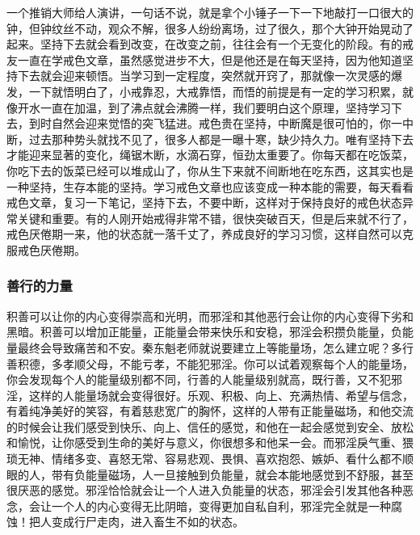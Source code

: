 一个推销大师给人演讲，一句话不说，就是拿个小锤子一下一下地敲打一口很大的钟，但钟纹丝不动，观众不解，很多人纷纷离场，过了很久，那个大钟开始晃动了起来。坚持下去就会看到改变，在改变之前，往往会有一个无变化的阶段。有的戒友一直在学戒色文章，虽然感觉进步不大，但是他还是在每天坚持，因为他知道坚持下去就会迎来顿悟。当学习到一定程度，突然就开窍了，那就像一次灵感的爆发，一下就悟明白了，小戒靠忍，大戒靠悟，而悟的前提是有一定的学习积累，就像开水一直在加温，到了沸点就会沸腾一样，我们要明白这个原理，坚持学习下去，到时自然会迎来觉悟的突飞猛进。戒色贵在坚持，中断魔是很可怕的，你一中断，过去那种势头就找不见了，很多人都是一曝十寒，缺少持久力。唯有坚持下去才能迎来显著的变化，绳锯木断，水滴石穿，恒劲太重要了。你每天都在吃饭菜，你吃下去的饭菜已经可以堆成山了，你从生下来就不间断地在吃东西，这其实也是一种坚持，生存本能的坚持。学习戒色文章也应该变成一种本能的需要，每天看看戒色文章，复习一下笔记，坚持下去，不要中断，这样对于保持良好的戒色状态异常关键和重要。有的人刚开始戒得非常不错，很快突破百天，但是后来就不行了，戒色厌倦期一来，他的状态就一落千丈了，养成良好的学习习惯，这样自然可以克服戒色厌倦期。

\subsubsection{善行的力量}

积善可以让你的内心变得崇高和光明，而邪淫和其他恶行会让你的内心变得下劣和黑暗。积善可以增加正能量，正能量会带来快乐和安稳，邪淫会积攒负能量，负能量最终会导致痛苦和不安。秦东魁老师就说要建立上等能量场，怎么建立呢？多行善积德，多孝顺父母，不能亏孝，不能犯邪淫。你可以试着观察每个人的能量场，你会发现每个人的能量级别都不同，行善的人能量级别就高，既行善，又不犯邪淫，这样的人能量场就会变得很好。乐观、积极、向上、充满热情、希望与信念，有着纯净美好的笑容，有着慈悲宽广的胸怀，这样的人带有正能量磁场，和他交流的时候会让我们感受到快乐、向上、信任的感觉，和他在一起会感觉到安全、放松和愉悦，让你感受到生命的美好与意义，你很想多和他呆一会。而邪淫戾气重、猥琐无神、情绪多变、喜怒无常、容易悲观、畏惧、喜欢抱怨、嫉妒、看什么都不顺眼的人，带有负能量磁场，人一旦接触到负能量，就会本能地感觉到不舒服，甚至很厌恶的感觉。邪淫恰恰就会让一个人进入负能量的状态，邪淫会引发其他各种恶念，会让一个人的内心变得无比阴暗，变得更加自私自利，邪淫完全就是一种腐蚀！把人变成行尸走肉，进入畜生不如的状态。

